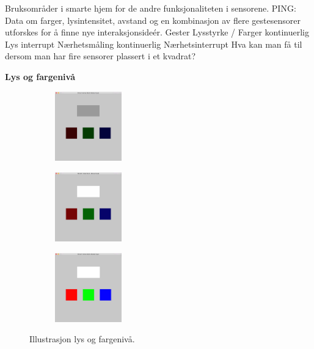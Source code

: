 Bruksområder i smarte hjem for de andre funksjonaliteten i sensorene.
PING: Data om farger, lysintensitet, avstand og en kombinasjon av flere gestesensorer utforskes for å finne nye interaksjonsideér.
Gester
Lysstyrke / Farger kontinuerlig
Lys interrupt
Nærhetsmåling kontinuerlig
Nærhetsinterrupt
Hva kan man få til dersom man har fire sensorer plassert i et kvadrat?

\textbf{Lys og fargenivå}\newline
\begin{figure}[h]
\centering
\begin{subfigure}{0.23\textwidth}
\includegraphics[width=3cm, height=3cm]{fig/color-1}
\caption{}
\label{fig:color-1}
\end{subfigure}
\begin{subfigure}{0.23\textwidth}
\includegraphics[width=3cm, height=3cm]{fig/color-2}
\caption{}
\label{fig:color-2}
\end{subfigure}
\begin{subfigure}{0.23\textwidth}
\includegraphics[width=3cm, height=3cm]{fig/color-3}
\caption{}
\label{fig:color-3}
\end{subfigure}
\caption{Illustrasjon lys og fargenivå.}
\label{fig:color}
\end{figure}

